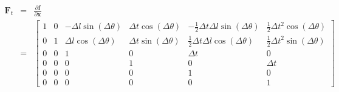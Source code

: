 \documentclass[12pt, a4paper]{article}
\begin{document}
\begin{eqnarray*}
  \bm{F}_{t} & = & \frac{\partial\bm{f}}{\partial\bm{x}}\\
  & = & \begin{bmatrix}
  1 & 0 & -\Delta l\sin(\Delta\theta) & \Delta t\cos(\Delta\theta) & -\frac{1}{2}\Delta t\Delta l\sin(\Delta\theta) & \frac{1}{2}\Delta t^2\cos(\Delta\theta)\\
  0 & 1 & \Delta l\cos(\Delta\theta) & \Delta t\sin(\Delta\theta) & \frac{1}{2}\Delta t\Delta l\cos(\Delta\theta) & \frac{1}{2}\Delta t^2\sin(\Delta\theta)\\
  0 & 0 & 1 & 0 & \Delta t & 0\\
  0 & 0 & 0 & 1 & 0 & \Delta t\\
  0 & 0 & 0 & 0 & 1 & 0\\
  0 & 0 & 0 & 0 & 0 & 1
  \end{bmatrix}
\end{eqnarray*}
\end{document}

